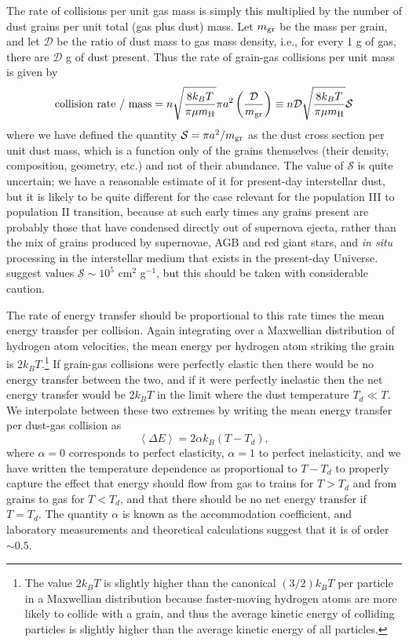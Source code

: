 The rate of collisions per unit gas mass is simply this multiplied by the number of dust grains per unit total (gas plus dust) mass. Let $m_{\rm gr}$ be the mass per grain, and let $\mathcal{D}$ be the ratio of dust mass to gas mass density, i.e., for every 1 g of gas, there are $\mathcal{D}$ g of dust present. Thus the rate of grain-gas collisions per unit mass is given by
\begin{equation}
\mbox{collision rate / mass} =  n \sqrt{\frac{8 k_B T}{\pi \mu m_{\rm H}}} \pi a^2 \left(\frac{\mathcal{D}}{m_{\rm gr}}\right)
\equiv n \mathcal{D} \sqrt{\frac{8 k_B T}{\pi \mu m_{\rm H}}} \mathcal{S}
\end{equation}
where we have defined the quantity $\mathcal{S} = \pi a^2/m_{\rm gr}$ as the dust cross section per unit dust mass, which is a function only of the grains themselves (their density, composition, geometry, etc.) and not of their abundance. The value of $\mathcal{S}$ is quite uncertain; we have a reasonable estimate of it for present-day interstellar dust, but it is likely to be quite different for the case relevant for the population III to population II transition, because at such early times any grains present are probably those that have condensed directly out of supernova ejecta, rather than the mix of grains produced by supernovae, AGB and red giant stars, and \textit{in situ} processing in the interstellar medium that exists in the present-day Universe. \citet{schneider12a} suggest values $\mathcal{S} \sim 10^5$ cm$^2$ g$^{-1}$, but this should be taken with considerable caution.

The rate of energy transfer should be proportional to this rate times the mean energy transfer per collision. Again integrating over a Maxwellian distribution of hydrogen atom velocities, the mean energy per hydrogen atom striking the grain is $2k_B T.$\footnote{The value $2k_B T$ is slightly higher than the canonical $(3/2) k_B T$ per particle in a Maxwellian distribution because faster-moving hydrogen atoms are more likely to collide with a grain, and thus the average kinetic energy of colliding particles is slightly higher than the average kinetic energy of all particles.}  If grain-gas collisions were perfectly elastic then there would be no energy transfer between the two, and if it were perfectly inelastic then the net energy transfer would be $2k_B T$ in the limit where the dust temperature $T_d \ll T$. We interpolate between these two extremes by writing the mean energy transfer per dust-gas collision as
\begin{equation}
\left\langle\Delta E\right\rangle = 2\alpha k_B (T - T_d),
\end{equation}
where $\alpha = 0$ corresponds to perfect elasticity, $\alpha=1$ to perfect inelasticity, and we have written the temperature dependence as proportional to $T-T_d$ to properly capture the effect that energy should flow from gas to trains for $T > T_d$ and from grains to gas for $T < T_d$, and that there should be no net energy transfer if $T=T_d$. The quantity $\alpha$ is known as the accommodation coefficient, and laboratory measurements and theoretical calculations suggest that it is of order $\sim 0.5$.


